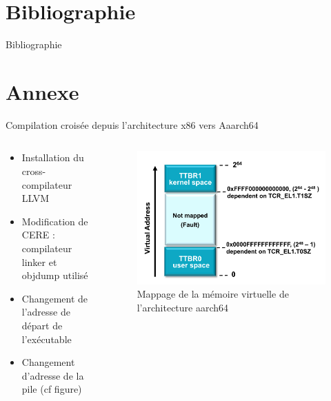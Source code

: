 \documentclass{beamer}
\begin{document}
\section{Bibliographie}
\begin{frame}{Bibliographie}

\tiny


\end{frame}

\section{Annexe}
\begin{frame}{Compilation croisée depuis l'architecture x86 vers Aaarch64}

\begin{columns}

\begin{column}{0.4\paperwidth}
\begin{itemize}
\item Installation du cross-compilateur LLVM
\item Modification de CERE : compilateur linker et objdump utilisé
\item Changement de l'adresse de départ de l'exécutable
\item Changement d'adresse de la pile (cf figure)
\end{itemize}
\end{column}


\begin{column}{0.4\paperwidth}
\begin{figure}
\includegraphics[width=\textwidth]{virtual_mem_aarch64.pdf}
\caption{Mappage de la mémoire virtuelle de l'architecture aarch64}
\end{figure}
\end{column}

\end{columns}

\end{frame}
\end{document}
